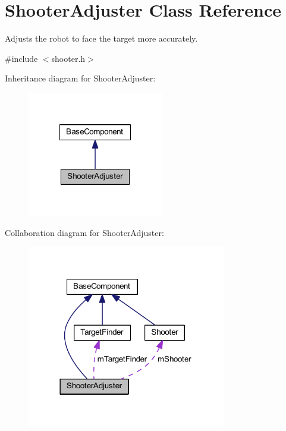 \hypertarget{class_shooter_adjuster}{\section{\-Shooter\-Adjuster \-Class \-Reference}
\label{class_shooter_adjuster}
}


\-Adjusts the robot to face the target more accurately.  




{\ttfamily \#include $<$shooter.\-h$>$}



\-Inheritance diagram for \-Shooter\-Adjuster\-:\nopagebreak
\begin{figure}[H]
\begin{center}
\leavevmode
\includegraphics[width=168pt]{class_shooter_adjuster__inherit__graph}
\end{center}
\end{figure}


\-Collaboration diagram for \-Shooter\-Adjuster\-:\nopagebreak
\begin{figure}[H]
\begin{center}
\leavevmode
\includegraphics[width=246pt]{class_shooter_adjuster__coll__graph}
\end{center}
\end{figure}
